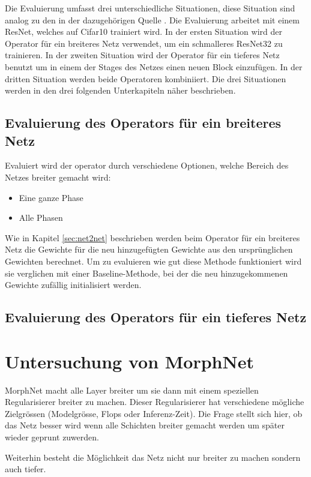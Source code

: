 Die Evaluierung umfasst drei unterschiedliche Situationen, diese Situation sind analog zu den in der dazugehörigen Quelle \cite{net2net}. Die Evaluierung arbeitet mit einem ResNet, welches auf Cifar10 trainiert wird. In der ersten Situation wird der Operator für ein breiteres Netz verwendet, um ein schmalleres ResNet32 zu trainieren. In der zweiten Situation wird der Operator für ein tieferes Netz benutzt um in einem der Stages des Netzes einen neuen Block einzufügen. In der dritten Situation werden beide Operatoren kombiniiert.
Die drei Situationen werden in den drei folgenden Unterkapiteln näher beschrieben.

\subsection{Evaluierung des Operators für ein breiteres Netz}
Evaluiert wird der operator durch verschiedene Optionen, welche Bereich des Netzes breiter gemacht wird:
\begin{itemize}
 \item Eine ganze Phase
 \item Alle Phasen
\end{itemize}
Wie in Kapitel \ref{sec:net2net} beschrieben werden beim Operator für ein breiteres Netz die Gewichte für die neu hinzugefügten Gewichte aus den ursprünglichen Gewichten berechnet. Um zu evaluieren wie gut diese Methode funktioniert wird sie verglichen mit einer Baseline-Methode, bei der die neu hinzugekommenen Gewichte zufällig initialisiert werden.
\subsection{Evaluierung des Operators für ein tieferes Netz}

\color{black}
\section{Untersuchung von MorphNet}\label{sec:morphexperimente}
MorphNet macht alle Layer breiter um sie dann mit einem speziellen Regularisierer breiter zu machen. Dieser Regularisierer hat verschiedene mögliche Zielgrössen (Modelgrösse, Flops oder Inferenz-Zeit).
Die Frage stellt sich hier, ob das Netz besser wird wenn alle Schichten breiter gemacht werden um später wieder geprunt zuwerden.

Weiterhin besteht die Möglichkeit das Netz nicht nur breiter zu machen sondern auch tiefer.


